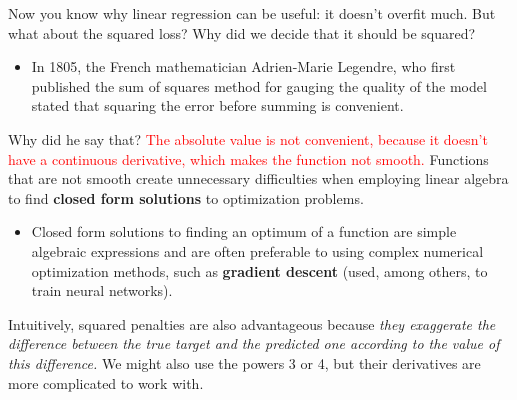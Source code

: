 \documentclass[9pt,dvipsnames]{beamer}
\begin{document}
\begin{frame}
	Now you know why linear regression can be useful: it doesn't overfit much. But what about the squared loss? Why did we decide that it should be squared? 
	\begin{itemize}
		\item In 1805, the French mathematician Adrien-Marie Legendre, who first published the sum of squares method for gauging the quality of the model stated that squaring the error before summing is convenient.
	\end{itemize}
	 Why did he say that? \textcolor{red}{The absolute value is not convenient, because it doesn't have a continuous derivative, which makes the function not smooth.} Functions that are not smooth create unnecessary difficulties when employing linear algebra to find \textbf{closed form solutions} to optimization problems. 
	 \begin{itemize}
	 	\item Closed form solutions to finding an optimum of a function are simple algebraic expressions and are often preferable to using complex numerical optimization methods, such as \textbf{gradient descent} (used, among others, to train neural networks).
	 \end{itemize}
	Intuitively, squared penalties are also advantageous because \textit{they exaggerate the difference between the true target and the predicted one according to the value of this difference.} We might also use the powers 3 or 4, but their derivatives are more complicated to work with.
\end{frame}
\end{document}
